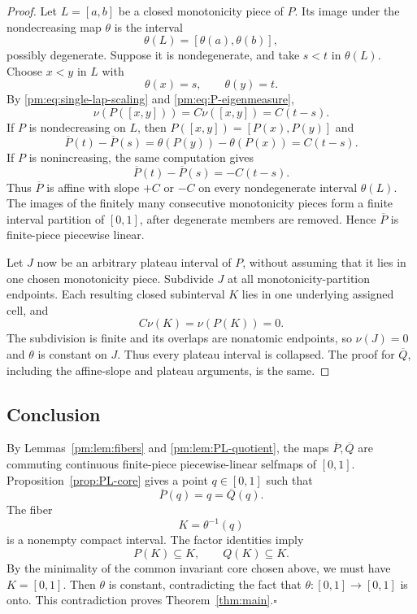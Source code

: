 \documentclass[11pt]{article}
\theoremstyle{definition}
\theoremstyle{remark}
\newcommand{\I}{[0,1]}
\begin{document}
\begin{proof}
Let $L=[a,b]$ be a closed monotonicity piece of $P$.  Its image under the
nondecreasing map $\theta$ is the interval
\[
 \theta(L)=[\theta(a),\theta(b)],
\]
possibly degenerate.  Suppose it is nondegenerate, and take
$s<t$ in $\theta(L)$.  Choose $x<y$ in $L$ with
\[
 \theta(x)=s,\qquad \theta(y)=t.
\]
By \eqref{pm:eq:single-lap-scaling} and \eqref{pm:eq:P-eigenmeasure},
\[
 \nu(P([x,y]))=C\nu([x,y])=C(t-s).
\]
If $P$ is nondecreasing on $L$, then $P([x,y])=[P(x),P(y)]$ and
\[
 \overline P(t)-\overline P(s)
 =\theta(P(y))-\theta(P(x))
 =C(t-s).
\]
If $P$ is nonincreasing, the same computation gives
\[
 \overline P(t)-\overline P(s)=-C(t-s).
\]
Thus $\overline P$ is affine with slope $+C$ or $-C$ on every
nondegenerate interval $\theta(L)$.  The images of the finitely many
consecutive monotonicity pieces form a finite interval partition of $\I$,
after degenerate members are removed.  Hence $\overline P$ is finite-piece
piecewise linear.

Let $J$ now be an arbitrary plateau interval of $P$, without assuming that
it lies in one chosen monotonicity piece.  Subdivide $J$ at all
monotonicity-partition endpoints.  Each resulting closed subinterval $K$
lies in one underlying assigned cell, and
\[
 C\nu(K)=\nu(P(K))=0.
\]
The subdivision is finite and its overlaps are nonatomic endpoints, so
$\nu(J)=0$ and $\theta$ is constant on $J$.  Thus every plateau interval is
collapsed.  The proof for $\overline Q$, including the affine-slope and
plateau arguments, is the same.
\end{proof}

\subsection{Conclusion}

By Lemmas~\ref{pm:lem:fibers} and \ref{pm:lem:PL-quotient}, the maps
$\overline P,\overline Q$ are commuting continuous finite-piece
piecewise-linear selfmaps of $\I$.  Proposition~\ref{prop:PL-core} gives a point
$q\in\I$ such that
\[
 \overline P(q)=q=\overline Q(q).
\]
The fiber
\[
 K=\theta^{-1}(q)
\]
is a nonempty compact interval.  The factor identities imply
\[
 P(K)\subseteq K,
 \qquad
 Q(K)\subseteq K.
\]
By the minimality of the common invariant core chosen above, we must have
$K=\I$.  Then $\theta$ is constant, contradicting the fact that
$\theta:\I\to\I$ is onto.  This contradiction proves
Theorem~\ref{thm:main}.\hfill\(\square\)\par
\end{document}
